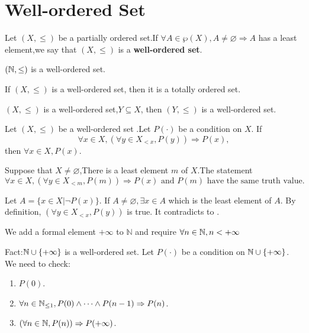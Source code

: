 \documentclass{book}
\numberwithin{equation}{section}
\begin{document}
\section{Well-ordered Set}
\begin{definitionenv}
    Let $(X,\le)$ be a partially ordered set.If $\forall A\in \wp(X),A\not=\varnothing\Rightarrow A$ has a least element,we say that $(X,\le)$ is a \textbf{well-ordered set}.
\end{definitionenv}
\begin{axiomenv}
    $(\mathbb{N},\le)$ is a well-ordered set.
\end{axiomenv}
\begin{propositionenv}
    If $(X,\le)$ is a well-ordered set, then it is a totally ordered set.
\end{propositionenv}
\begin{propositionenv}
    $(X,\le)$ is a well-ordered set,$Y\subseteq X$, then $(Y,\le)$ is a well-ordered set. 
\end{propositionenv}
\begin{theoremenv}
    Let $(X,\le)$ be a well-ordered set .Let $P(\cdot)$ be a condition on $X$. If 
    $$\forall x\in X,(\forall y\in X_{<x} ,P(y))\Rightarrow P(x),$$
    then $\forall x\in X,P(x)$.
\end{theoremenv}
\begin{remark}
    Suppose that $X\not=\varnothing$,There is a least element $m$ of $X$.The statement
    $$\forall x\in X,(\forall y\in X_{<m} ,P(m))\Rightarrow P(x) \text{ and } P(m) \text{ have the same truth value.}$$
\end{remark}
\begin{proofenv}
    Let $A=\{x\in X|\neg P(x)\}$. If $A\not=\varnothing,\exists x\in A$ which is the least element of $A$. By definition, $(\forall y\in X_{<x} ,P(y))$ is true. It contradicts to .
\end{proofenv}
\begin{remark}
    We add a formal element $+\infty$ to $\mathbb{N}$ and require $\forall n\in \mathbb{N}, n<+\infty$
\end{remark}
Fact:$\mathbb{N} \cup \{+\infty\}$ is a well-ordered set. Let $P(\cdot)$ be a condition on $\mathbb{N} \cup \{+\infty\}$. We need to check:
\begin{enumerate}
    \item $P(0)$.
    \item $\forall n\in \mathbb{N}_{\leq 1},P(0)\wedge\dots\wedge P(n-1)\Rightarrow P(n)$.
    \item $(\forall n \in \mathbb{N},P(n))\Rightarrow P(+\infty)$.
\end{enumerate}
\end{document}
